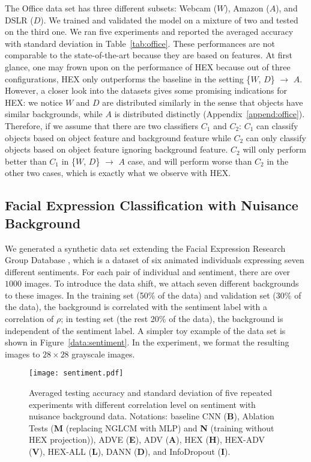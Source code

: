 The Office data set has three different subsets: 
Webcam ($W$), Amazon ($A$), and DSLR ($D$). 
We trained and validated the model on a mixture 
of two and tested on the third one. 
We ran five experiments and reported the averaged accuracy 
with standard deviation in Table~\ref{tab:office}. 
These performances are not comparable to the state-of-the-art 
because they are based on features. 
At first glance, one may frown upon on the performance of HEX 
because out of three configurations, 
HEX only outperforms the baseline in the setting \{$W$, $D$\} $\rightarrow$ $A$. 
However, a closer look into the datasets gives some promising indications for HEX: 
we notice $W$ and $D$ are distributed similarly 
in the sense that objects have similar backgrounds, 
while $A$ is distributed distinctly (Appendix~\ref{append:office}). 
Therefore, if we assume that there are two classifiers $C_1$ and $C_2$: $C_1$ 
can classify objects based on object feature 
and background feature while $C_2$ can only classify objects 
based on object feature ignoring background feature. 
$C_2$ will only perform better than $C_1$ in \{$W$, $D$\} $\rightarrow$ $A$ case, 
and will perform worse than $C_2$ in the other two cases, 
which is exactly what we observe with HEX.

\subsection{Facial Expression Classification with Nuisance Background}
We generated a synthetic data set extending the Facial Expression Research Group Database \citep{aneja2016modeling}, 
which is a dataset of six animated individuals 
expressing seven different sentiments. 
For each pair of individual and sentiment, 
there are over $1000$ images. 
To introduce the data shift, 
we attach seven different backgrounds to these images. 
In the training set (50\% of the data) 
and validation set (30\% of the data), 
the background is correlated with the sentiment label 
with a correlation of $\rho$; 
in testing set (the rest 20\% of the data), 
the background is independent of the sentiment label. 
A simpler toy example of the data set is shown in Figure~\ref{data:sentiment}. 
In the experiment, we format the resulting images to $28\times28$ grayscale images. 



\begin{figure}
    \centering
    \texttt{[image: sentiment.pdf]}
    \caption{Averaged testing accuracy and standard deviation of five repeated experiments with different correlation level on sentiment with nuisance background data. Notations: baseline CNN (\textbf{B}), Ablation Tests (\textbf{M} (replacing NGLCM with MLP) and \textbf{N} (training without HEX projection)), ADVE (\textbf{E}), ADV (\textbf{A}), HEX (\textbf{H}), HEX-ADV (\textbf{V}), HEX-ALL (\textbf{L}), DANN (\textbf{D}), and InfoDropout (\textbf{I}).}
    \label{fig:sentiment}
\end{figure}

